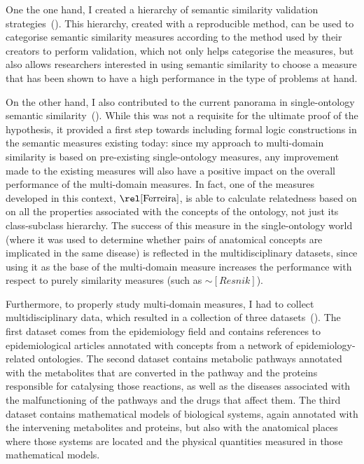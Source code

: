 One the one hand, I created a hierarchy of semantic similarity validation strategies~(). This hierarchy, created with a reproducible method, can be used to categorise semantic similarity measures according to the method used by their creators to perform validation, which not only helps categorise the measures, but also allows researchers interested in using semantic similarity to choose a measure that has been shown to have a high performance in the type of problems at hand.

On the other hand, I also contributed to the current panorama in single-ontology semantic similarity~(). While this was not a requisite for the ultimate proof of the hypothesis, it provided a first step towards including formal logic constructions in the semantic measures existing today: since my approach to multi-domain similarity is based on pre-existing single-ontology measures, any improvement made to the existing measures will also have a positive impact on the overall performance of the multi-domain measures. In fact, one of the measures developed in this context, $\ferreira$, is able to calculate relatedness based on on all the properties associated with the concepts of the ontology, not just its class-subclass hierarchy. The success of this measure in the single-ontology world (where it was used to determine whether pairs of anatomical concepts are implicated in the same disease) is reflected in the multidisciplinary datasets, since using it as the base of the multi-domain measure increases the performance with respect to purely similarity measures (such as $\sim[Resnik]$).

Furthermore, to properly study multi-domain measures, I had to collect multidisciplinary data, which resulted in a collection of three datasets~(). The first dataset comes from the epidemiology field and contains references to epidemiological articles annotated with concepts from a network of epidemiology-related ontologies. The second dataset contains metabolic pathways annotated with the metabolites that are converted in the pathway and the proteins responsible for catalysing those reactions, as well as the diseases associated with the malfunctioning of the pathways and the drugs that affect them. The third dataset contains mathematical models of biological systems, again annotated with the intervening metabolites and proteins, but also with the anatomical places where those systems are located and the physical quantities measured in those mathematical models.

